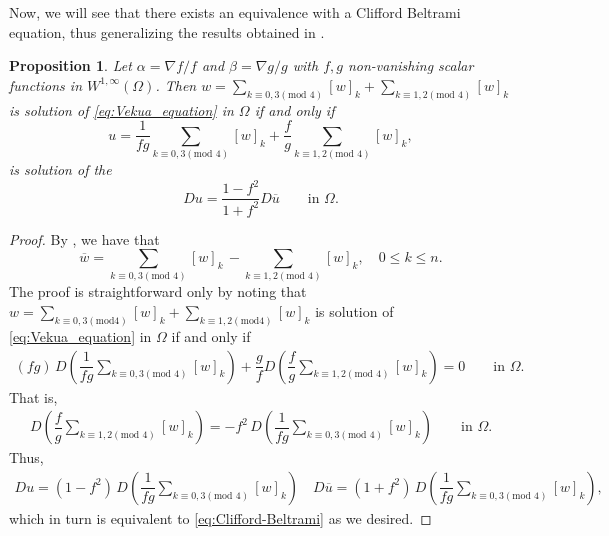 \documentclass[12pt]{article}
\newtheorem{proposition}[theorem]{Proposition}
\begin{document}

Now, we will see that there exists an equivalence with a Clifford Beltrami equation, thus generalizing the results obtained in \cite{Santa2019, DelPor2019}.
\begin{proposition}\label{prop:Beltrami equivalence}
Let $\alpha=\nabla f/f$ and $\beta=\nabla g/g$ with $f, g$ non-vanishing scalar functions in $ W^{1,\infty}(\Omega)$. Then $w=\sum_{k\equiv 0,3 (\text{mod } 4)} [w]_k+\sum_{k\equiv 1,2 (\text{mod } 4)} [w]_k$ is solution of \eqref{eq:Vekua_equation} in $\Omega$ if and only if
\begin{equation}\label{eq:transformation-solution}
  u=\dfrac{1}{fg}\sum_{k\equiv 0,3 (\text{mod } 4)} [w]_k+\dfrac{f}{g}\sum_{k\equiv 1,2 (\text{mod } 4)} [w]_k,
\end{equation}\color{black}
is solution of the 
\begin{equation}\label{eq:Clifford-Beltrami}
    Du=\dfrac{1-f^2}{1+f^2} D\overline{u}\qquad \text{in }\Omega.
\end{equation}
\end{proposition}
\begin{proof}
By \cite[Prop. 3.8]{GuHaSpr2008}, we have that
\[
\overline{w}=\sum_{k\equiv 0,3 (\text{mod } 4)} [w]_k\,-\sum_{k\equiv 1,2 (\text{mod } 4)} [w]_k, \quad 0\leq k\leq n.
\]
The proof is straightforward only by noting that  $w=\sum_{k\equiv 0,3 (\text{mod} 4)} [w]_k+\sum_{k\equiv 1,2 (\text{mod} 4)} [w]_k$ is solution of \eqref{eq:Vekua_equation} in $\Omega$ if and only if 
\begin{align*}
 (fg)\, D\left(\dfrac{1}{fg} \sum_{k\equiv 0,3 (\text{mod } 4)} [w]_k \right)+\dfrac{g}{f} D\left(\dfrac{f}{g} \sum_{k\equiv 1,2 (\text{mod } 4)} [w]_k \right)=0\qquad \text{in }\Omega.
\end{align*}
That is, 
\begin{align}\label{eq:equivalent-Vekua}
 D\left(\dfrac{f}{g} \sum_{k\equiv 1,2 (\text{mod } 4)} [w]_k \right)=-f^2\, D\left(\dfrac{1}{fg} \sum_{k\equiv 0,3 (\text{mod } 4)} [w]_k \right)\qquad \text{in }\Omega.
\end{align}
Thus, 
\begin{align*}
Du=(1-f^2)\,D\left(\dfrac{1}{fg}\sum_{k\equiv 0,3 (\text{mod } 4)} [w]_k\right)\quad
D\overline{u}=(1+f^2)\,D\left(\dfrac{1}{fg}\sum_{k\equiv 0,3 (\text{mod } 4)} [w]_k\right),
\end{align*}
which in turn is equivalent to \eqref{eq:Clifford-Beltrami} as we desired.
\end{proof}
\end{document}
